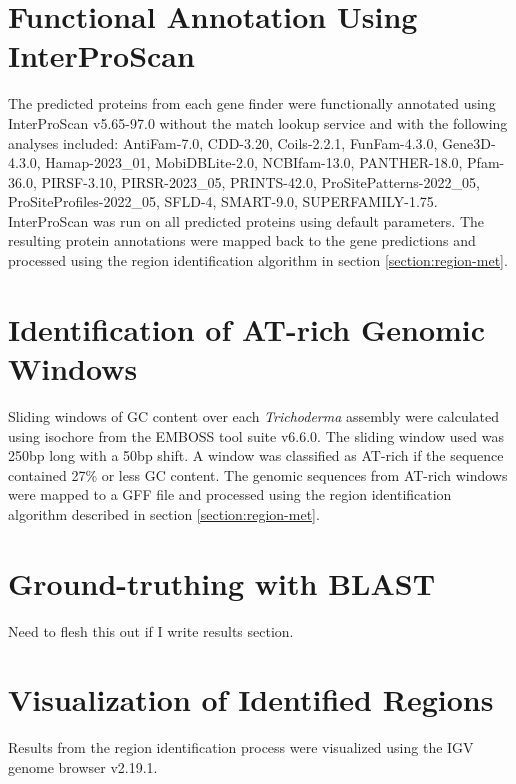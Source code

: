 \section{Functional Annotation Using InterProScan}

The predicted proteins from each gene finder were functionally
annotated using InterProScan
v5.65-97.0\cite{10.1093/bioinformatics/btu031} without the match
lookup service and with the following analyses included: AntiFam-7.0,
CDD-3.20, Coils-2.2.1, FunFam-4.3.0, Gene3D-4.3.0, Hamap-2023\_01,
MobiDBLite-2.0, NCBIfam-13.0, PANTHER-18.0, Pfam-36.0, PIRSF-3.10,
PIRSR-2023\_05, PRINTS-42.0, ProSitePatterns-2022\_05,
ProSiteProfiles-2022\_05, SFLD-4, SMART-9.0,
SUPERFAMILY-1.75. InterProScan was run on all predicted proteins using
default parameters. The resulting protein annotations were mapped back
to the gene predictions and processed using the region identification
algorithm in section \ref{section:region-met}.

\section{Identification of AT-rich Genomic Windows}

Sliding windows of GC content over each \textit{Trichoderma} assembly
were calculated using isochore from the EMBOSS tool suite
v6.6.0\cite{Rice2000}. The sliding window used was 250bp long with a
50bp shift. A window was classified as AT-rich if the sequence
contained 27\% or less GC content. The genomic sequences from AT-rich
windows were mapped to a GFF file and processed using the region
identification algorithm described in section
\ref{section:region-met}.

\section{Ground-truthing with BLAST}

Need to flesh this out if I write results section.

\section{Visualization of Identified Regions}

Results from the region identification process were visualized using
the IGV genome browser v2.19.1\cite{Robinson2011}.

